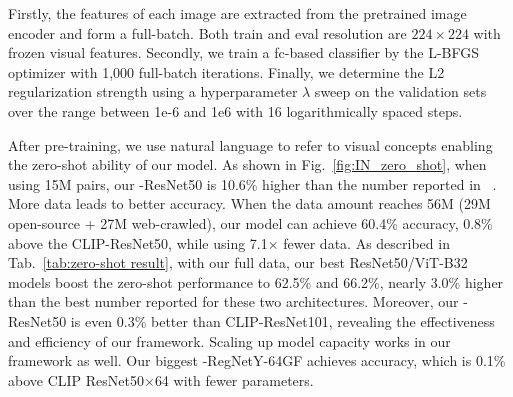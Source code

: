 Firstly, the features of each image are extracted from the pretrained image encoder and form a full-batch. 
Both train and eval resolution are $224\times224$ with frozen visual features.
Secondly, we train a fc-based classifier by the L-BFGS optimizer with 1,000 full-batch iterations.
Finally, we determine the L2 regularization strength using a hyperparameter $\lambda$ sweep on the validation sets over the range between 1e-6 and 1e6 with 16 logarithmically spaced steps.





After pre-training, we use natural language to refer to visual concepts enabling the zero-shot ability of our model.
As shown in Fig.~\ref{fig:IN_zero_shot}, when using 15M pairs, our \workname-ResNet50 is 10.6\% higher than the number reported in ~\citet{radford2021learning}. 
More data leads to better accuracy. 
When the data amount reaches 56M (29M open-source + 27M web-crawled), our model can achieve 60.4\% accuracy, 0.8\% above the CLIP-ResNet50, while using 7.1$\times$ fewer data. 
As described in Tab.~\ref{tab:zero-shot result}, with our full data, our best ResNet50/ViT-B32 models boost the zero-shot performance to 62.5\% and 66.2\%, nearly 3.0\% higher than the best number reported for these two architectures. Moreover, our \workname-ResNet50 is even 0.3\% better than CLIP-ResNet101, revealing the effectiveness and efficiency of our framework. Scaling up model capacity works in our framework as well. Our biggest \workname-RegNetY-64GF achieves  accuracy, which is 0.1\% above CLIP ResNet50$\times$64 with fewer parameters. 



